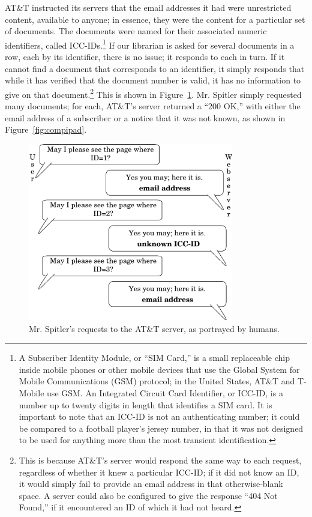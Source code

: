 \documentclass{article}
\begin{document}
	
	AT\&T instructed its servers that the email addresses it had were unrestricted content, available to anyone; in essence, they were the content for a particular set of documents. The documents were named for their associated numeric identifiers, called ICC-IDs.\footnote{A Subscriber Identity Module, or ``SIM Card,'' is a small replaceable chip inside mobile phones or other mobile devices that use the Global System for Mobile Communications (GSM) protocol; in the United States, AT\&T and T-Mobile use GSM. An Integrated Circuit Card Identifier, or ICC-ID, is a number up to twenty digits in length that identifies a SIM card. It is important to note that an ICC-ID is not an authenticating number; it could be compared to a football player's jersey number, in that it was not designed to be used for anything more than the most transient identification.} If our librarian is asked for several documents in a row, each by its identifier, there is no issue; it responds to each in turn. If it cannot find a document that corresponds to an identifier, it simply responds that while it has verified that the document number is valid, it has no information to give on that document.\footnote{This is because AT\&T's server would respond the same way to each request, regardless of whether it knew a particular ICC-ID; if it did not know an ID, it would simply fail to provide an email address in that otherwise-blank space. A server could also be configured to give the response ``404 Not Found,'' if it encountered an ID of which it had not heard.} This is shown in Figure~\ref{fig:humipad}.	Mr. Spitler simply requested many documents; for each, AT\&T's server returned a ``200 OK,'' with either the email address of a subscriber or a notice that it was not known, as shown in Figure~\ref{fig:compipad}.
	
	\begin{figure}[ht!]
	  \centering
	  \includegraphics[width=0.8\textwidth]{diagrams/ipad2}
	  \caption{Mr. Spitler's requests to the AT\&T server, as portrayed by humans.}
		\label{fig:humipad}
	\end{figure}
\end{document}
